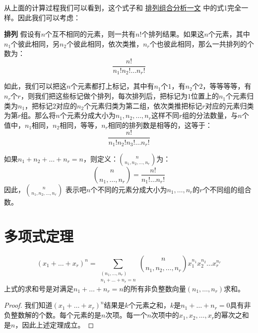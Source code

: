 \documentclass[10pt,a4paper,UTF8]{article}
\begin{document}
从上面的计算过程我们可以看到，这个式子和 \href{afcp-combinatorial-analysis.org}{排列组合分析一文} 中的式1完全一样。因此我们可以考虑：

\textbf{排列} 假设有\(n\)个互不相同的元素，则一共有\(n!\)个排列结果。如果这\(n\)个元素，其中\(n_{1}\)个彼此相同，另\(n_{2}\)个彼此相同，依次类推，\(n_{r}\)个也彼此相同，那么一共排列的个数为：
\begin{equation}
\label{eq:4}
\frac{n!}{n_{1}!n_{2}!\ldots n_{r}!}
\end{equation}

如此，我们可以把这\(n\)个元素都打上标记，其中有\(n_{1}\)个\(1\)，有\(n_{2}\)个\(2\)，等等等等，有\(n_{r}\)个\(r\)，则我们把这些标记做个排列，每次排列后，把标记为\(1\)位置上的\(n_{1}\)个元素归类为\(n_{1}\)，把标记\(2\)对应的\(n_{2}\)个元素归类为第二组，依次类推把标记\(r\)对应的元素归类为第\(r\)组。那么将\(n\)个元素分成大小为\(n_{1},n_{2},\ldots ,n_{r}\)这样不同\(r\)组的分法数量，与\(n\)个值中，\(n_{1}\)相同，\(n_{2}\)相同，等等，\(n_{r}\)相同的排列数是相等的，这等于：\[\frac{n!}{n_{1}!n_{2}!n_{3}!\ldots n_{r}!} \]

\begin{definition}
如果\(n_{1} + n_{2} + \ldots + n_{r} = n\)，则定义：\(\binom{n}{n_{1},n_{2},\ldots ,n_{r}}\)为：\[\binom{n}{n_{1},\ldots ,n_{r}} = \frac{n!}{n_{1}!\ldots n_{r}!}\] 因此，\(\binom{n}{n_{1},n_{2},\ldots ,n_{r}}\) 表示吧\(n\)个不同的元素分成大小为\(n_{1},\ldots ,n_{r}\)的\(r\)个不同组的组合数。
\end{definition}
\section{多项式定理}
\label{sec:org9f0b56a}


\begin{theorem}
\begin{equation}
\label{eq:5}
(x_{1} + \ldots + x_{r})^{n} = \sum_{\substack{ (n_{1},\ldots ,n_{r}) \\ n_{1} + \ldots + n_{r} = n }} \binom{n}{n_{1},n_{2},\ldots ,n_{r}} x_{1}^{n_{1}}x_{2}^{n_{2}}\ldots x_{r}^{n_{r}}
\end{equation}
上式的求和号是对满足\(n_{1}+ \ldots + n_{r} = n\)的所有非负整数向量\((n_{1},\ldots ,n_{r})\)求和。
\end{theorem}

\begin{proof}
我们知道\((x_{1} + \ldots + x_{r})^{n}\)结果是\(k\)个元素之和，\(k\)是\(n_{1}+\ldots +n_{r} = 0\)具有非负整数解的个数。每个元素的是\(n\)次项。每一个\(n\)次项中的\(x_{1},x_{2},\ldots ,x_{r}\)的幂次之和是\(n\)，因此上述定理成立。
\end{proof}
\end{document}
